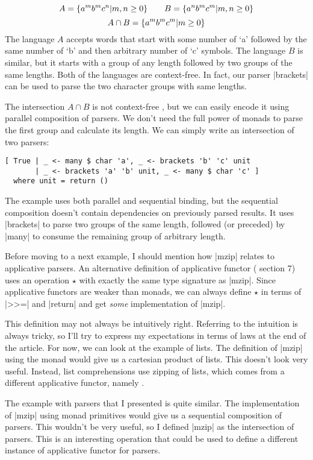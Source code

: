 \documentclass{tmr}
\begin{document}
\[ 
A = \{ a^m b^m c^n \arrowvert m, n \geq 0 \} 
\qquad
B = \{ a^n b^m c^m \arrowvert m, n \geq 0 \} 
\]
\[ 
A \cap B = \{ a^m b^m c^m \arrowvert m \geq 0 \}
\]
The language $A$ accepts words that start with some number of `a' followed by the same
number of `b' and then arbitrary number of `c' symbols. The language $B$ is similar, but it
starts with a group of any length followed by two groups of the same lengths. Both of the
languages are context-free. In fact, our parser |brackets| can be used to parse the two 
character groups with same lengths.

The intersection $A \cap B$ is not context-free \cite{cflintersect}, but we can easily
encode it using parallel composition of parsers. We don't need the full power of monads
to parse the first group and calculate its length. We can simply write an intersection 
of two parsers:

\begin{verbatim}
[ True | _ <- many $ char 'a', _ <- brackets 'b' 'c' unit
       | _ <- brackets 'a' 'b' unit, _ <- many $ char 'c' ]
  where unit = return ()
\end{verbatim}
The example uses both parallel and sequential binding, but the sequential composition doesn't
contain dependencies on previously parsed results. It uses |brackets| to parse two groups of the
same length, followed (or preceded) by |many| to consume the remaining group of arbitrary length.

Before moving to a next example, I should mention how |mzip| relates to applicative parsers.
An alternative definition of applicative functor (\cite{applicative} section 7) uses an operation
$\star$ with exactly the same type signature as |mzip|. Since applicative functors are weaker than 
monads, we can always define $\star$ in terms of |>>=| and |return| and get \textit{some} 
implementation of |mzip|.

This definition may not always be intuitively right. Referring to the intuition is always tricky, 
so I'll try to express my expectations in terms of laws at the end of the article. For now, we 
can look at the example of lists. The definition of |mzip| using the 
monad would give us a cartesian product of lists. This doesn't look very useful. Instead, list 
comprehensions use zipping of lists, which comes from a different applicative functor, namely
.

The example with parsers that I presented is quite similar. The implementation of |mzip| using 
monad primitives would give us a sequential composition of parsers. This wouldn't be very useful,
so I defined |mzip| as the intersection of parsers. This is an interesting operation that could be 
used to define a different instance of applicative functor for parsers.
\end{document}
